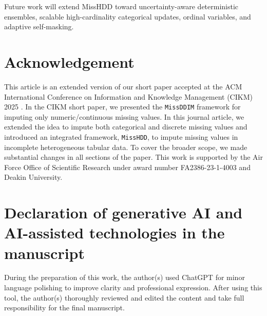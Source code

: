 \documentclass[times, review, 10pt]{elsarticle}
\begin{document}
Future work will extend MissHDD toward uncertainty-aware deterministic
ensembles, scalable high-cardinality categorical updates, ordinal variables,
and adaptive self-masking.



\section*{Acknowledgement}

This article is an extended version of our short paper accepted at the ACM International Conference on Information and Knowledge Management (CIKM) 2025 \cite{missddim}. In the CIKM short paper, we presented the {\tt MissDDIM} framework for imputing only numeric/continuous missing values. In this journal article, we extended the idea to impute both categorical and discrete missing values and introduced an integrated framework, {\tt MissHDD}, to impute missing values in incomplete heterogeneous tabular data. To cover the broader scope, we made substantial changes in all sections of the paper.
This work is supported by the Air Force Office of Scientific Research under award number FA2386-23-1-4003 and Deakin University.

\section*{Declaration of generative AI and AI-assisted technologies in the manuscript}
During the preparation of this work, the author(s) used ChatGPT for minor language polishing to improve clarity and professional expression. After using this tool, the author(s) thoroughly reviewed and edited the content and take full responsibility for the final manuscript.



\end{document}
